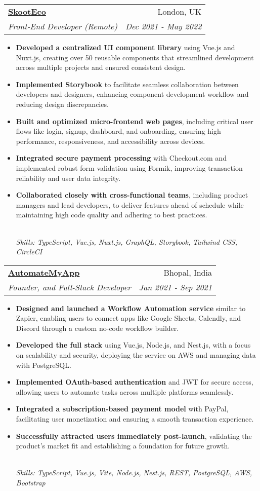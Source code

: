 \documentclass[letterpaper,12pt]{article}
\makeatletter
\newcommand{\resumeItem}[1]{
  \item\small{#1}\vspace{-2pt}
}
\newcommand{\resumeSubheading}[4]{
  \vspace{-2pt}\item
    \begin{tabular*}{1\textwidth}[t]{l@{\extracolsep{\fill}}r}
      \textbf{#1} & \small{#2} \\
      \emph{\small{#3}} & \emph{\small{#4}} \\
    \end{tabular*}\vspace{-5pt}
}
\newcommand{\resumeItemFooter}[1]{
    \\ \vspace{7pt}\hspace{-0.35in}\footnotesize\emph{#1}
}
\newcommand{\resumeItemListStart}{\begin{itemize}}
\newcommand{\resumeItemListEnd}{\end{itemize}\vspace{-5pt}}
\def\myHometown{Bhopal, India}
\def\skootLink{https://skoot.eco}
\def\automateMyAppLink{https://automatemyapp.com}
\makeatother
\begin{document}
\resumeSubheading
{\href{\skootLink}{\color{blue}SkootEco}}{London, UK}
{Front-End Developer (Remote)}{Dec 2021 - May 2022}
\resumeItemListStart
\resumeItem{\textbf{Developed a centralized UI component library} using Vue.js and Nuxt.js, creating over 50 reusable components that streamlined development across multiple projects and ensured consistent design.}
\resumeItem{\textbf{Implemented Storybook} to facilitate seamless collaboration between developers and designers, enhancing component development workflow and reducing design discrepancies.}
\resumeItem{\textbf{Built and optimized micro-frontend web pages}, including critical user flows like login, signup, dashboard, and onboarding, ensuring high performance, responsiveness, and accessibility across devices.}
\resumeItem{\textbf{Integrated secure payment processing} with Checkout.com and implemented robust form validation using Formik, improving transaction reliability and user data integrity.}
\resumeItem{\textbf{Collaborated closely with cross-functional teams}, including product managers and lead developers, to deliver features ahead of schedule while maintaining high code quality and adhering to best practices.}
\resumeItemFooter{Skills: TypeScript, Vue.js, Nuxt.js, GraphQL, Storybook, Tailwind CSS, CircleCI}
\resumeItemListEnd

\resumeSubheading
{\href{\automateMyAppLink}{\color{blue}AutomateMyApp}}{\myHometown}
{Founder, and Full-Stack Developer}{Jan 2021 - Sep 2021}
\resumeItemListStart
\resumeItem{\textbf{Designed and launched a Workflow Automation service} similar to Zapier, enabling users to connect apps like Google Sheets, Calendly, and Discord through a custom no-code workflow builder.}
\resumeItem{\textbf{Developed the full stack} using Vue.js, Node.js, and Nest.js, with a focus on scalability and security, deploying the service on AWS and managing data with PostgreSQL.}
\resumeItem{\textbf{Implemented OAuth-based authentication} and JWT for secure access, allowing users to automate tasks across multiple platforms seamlessly.}
\resumeItem{\textbf{Integrated a subscription-based payment model} with PayPal, facilitating user monetization and ensuring a smooth transaction experience.}
\resumeItem{\textbf{Successfully attracted users immediately post-launch}, validating the product's market fit and establishing a foundation for future growth.}
\resumeItemFooter{Skills: TypeScript, Vue.js, Vite, Node.js, Nest.js, REST, PostgreSQL, AWS, Bootstrap}
\resumeItemListEnd
\end{document}
